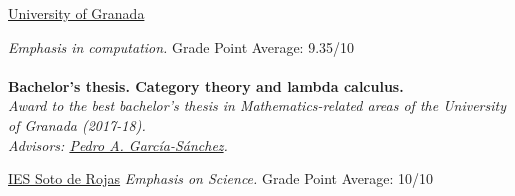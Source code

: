 \documentclass[nocolors]{friggeri-cv-a4}
\begin{document}
\begin{entrylist}
{\href{http://www.ugr.es/en/}{University of Granada}}
{\emph{Emphasis in computation.} Grade Point Average: 9.35/10 \\ \\
  { \textbf{Bachelor's thesis. Category theory and lambda calculus.} \\
    \emph{Award to the best bachelor's thesis in Mathematics-related areas of the University of Granada (2017-18). \\
    Advisors: \href{https://scholar.google.es/citations?user=gvq9UmMAAAAJ&hl=en&oi=ao}{Pedro A. García-Sánchez}.}
  }
  
} 

{\href{http://www.juntadeandalucia.es/averroes/centros-tic/18700037/helvia/sitio/}{IES Soto de Rojas}}
{\emph{Emphasis on Science.} Grade Point Average: 10/10
  {
  } 
}


\end{entrylist}
\end{document}
